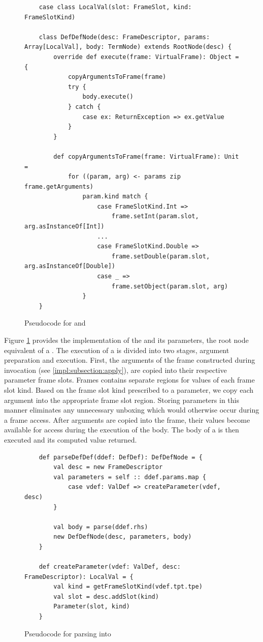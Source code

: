 \begin{figure}[!htb]
	\begin{verbatim}
	case class LocalVal(slot: FrameSlot, kind: FrameSlotKind)
		
	class DefDefNode(desc: FrameDescriptor, params: Array[LocalVal], body: TermNode) extends RootNode(desc) {
		override def execute(frame: VirtualFrame): Object = {
			copyArgumentsToFrame(frame)
			try {
				body.execute()
			} catch {
				case ex: ReturnException => ex.getValue
			}
		}	
			
		def copyArgumentsToFrame(frame: VirtualFrame): Unit = 
			for ((param, arg) <- params zip frame.getArguments) 
				param.kind match {
					case FrameSlotKind.Int =>
						frame.setInt(param.slot, arg.asInstanceOf[Int])
					...
					case FrameSlotKind.Double =>
						frame.setDouble(param.slot, arg.asInstanceOf[Double])	
					case _ =>
						frame.setObject(param.slot, arg)
				}
	}
	\end{verbatim}
	\caption{Pseudocode for  and }
	\label{impl:defdefnode}
\end{figure}

Figure \ref{impl:defdefnode} provides the implementation of the  and its parameters, the root node equivalent of a .
The execution of a  is divided into two stages, argument preparation and execution.
First, the arguments of the frame constructed during invocation (see \ref{impl:subsection:apply}), are copied into their respective parameter frame slots.
Frames contains separate regions for values of each frame slot kind.
Based on the frame slot kind prescribed to a parameter, we copy each argument into the appropriate frame slot region.
Storing parameters in this manner eliminates any unnecessary unboxing which would otherwise occur during a frame access.
After arguments are copied into the frame, their values become available for access during the execution of the body.
The body of a  is then executed and its computed value returned.

\begin{figure}[!htb]
	\begin{verbatim}
	def parseDefDef(ddef: DefDef): DefDefNode = {
		val desc = new FrameDescriptor
		val parameters = self :: ddef.params.map {
			case vdef: ValDef => createParameter(vdef, desc)
		}
			
		val body = parse(ddef.rhs)
		new DefDefNode(desc, parameters, body)
	}
		
	def createParameter(vdef: ValDef, desc: FrameDescriptor): LocalVal = {
		val kind = getFrameSlotKind(vdef.tpt.tpe)
		val slot = desc.addSlot(kind)
		Parameter(slot, kind)
	}
	\end{verbatim}
	\caption{Pseudocode for parsing  into }
	\label{impl:parse-defdef}
\end{figure}

